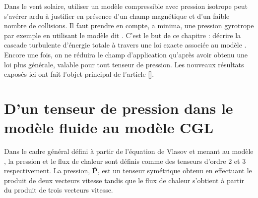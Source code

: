 Dans le vent solaire, utiliser un modèle  compressible avec pression isotrope peut s'avérer ardu à justifier en présence d'un champ magnétique et d'un faible nombre de collisions. Il faut prendre en compte, a minima, une pression gyrotrope par exemple en utilisant le modèle dit . C'est le but de ce chapitre : décrire la cascade turbulente d'énergie totale à travers une loi exacte associée au modèle . Encore une fois, on ne réduira le champ d'application qu'après avoir obtenu une loi plus générale, valable pour tout tenseur de pression. Les nouveaux résultats exposés ici ont fait l'objet principal de l'article [\cite{simon_exact_2022}].

\section{D'un tenseur de pression dans le modèle fluide au modèle CGL}
\label{sec-211}

Dans le cadre général défini à partir de l'équation de Vlasov et menant au modèle , la pression et le flux de chaleur sont définis comme des tenseurs d'ordre 2 et 3 respectivement. La pression, $\overline{\boldsymbol{P}} $, est un tenseur symétrique obtenu en effectuant le produit de deux vecteurs vitesse tandis que le flux de chaleur s'obtient à partir du produit de trois vecteurs vitesse. 

